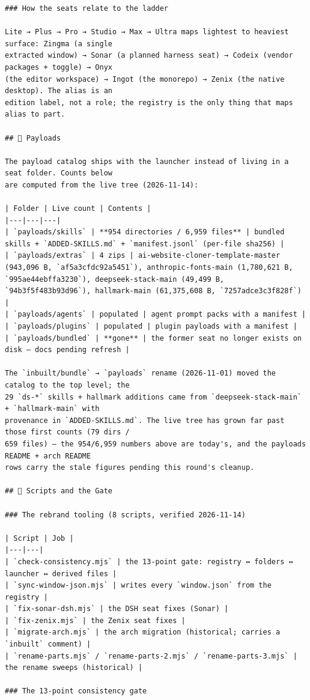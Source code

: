 \begin{Verbatim}[breaklines,breakanywhere,fontsize=\footnotesize]
### How the seats relate to the ladder

Lite → Plus → Pro → Studio → Max → Ultra maps lightest to heaviest surface: Zingma (a single
extracted window) → Sonar (a planned harness seat) → Codeix (vendor packages + toggle) → Onyx
(the editor workspace) → Ingot (the monorepo) → Zenix (the native desktop). The alias is an
edition label, not a role; the registry is the only thing that maps alias to part.

## 🎒 Payloads

The payload catalog ships with the launcher instead of living in a seat folder. Counts below
are computed from the live tree (2026-11-14):

| Folder | Live count | Contents |
|---|---|---|
| `payloads/skills` | **954 directories / 6,959 files** | bundled skills + `ADDED-SKILLS.md` + `manifest.jsonl` (per-file sha256) |
| `payloads/extras` | 4 zips | ai-website-cloner-template-master (943,096 B, `af5a3cfdc92a5451`), anthropic-fonts-main (1,780,621 B, `995ae44ebffa3230`), deepseek-stack-main (49,499 B, `94b3f5f483b93d96`), hallmark-main (61,375,608 B, `7257adce3c3f828f`) |
| `payloads/agents` | populated | agent prompt packs with a manifest |
| `payloads/plugins` | populated | plugin payloads with a manifest |
| `payloads/bundled` | **gone** | the former seat no longer exists on disk — docs pending refresh |

The `inbuilt/bundle` → `payloads` rename (2026-11-01) moved the catalog to the top level; the
29 `ds-*` skills + hallmark additions came from `deepseek-stack-main` + `hallmark-main` with
provenance in `ADDED-SKILLS.md`. The live tree has grown far past those first counts (79 dirs /
659 files) — the 954/6,959 numbers above are today's, and the payloads README + arch README
rows carry the stale figures pending this round's cleanup.

## 🧰 Scripts and the Gate

### The rebrand tooling (8 scripts, verified 2026-11-14)

| Script | Job |
|---|---|
| `check-consistency.mjs` | the 13-point gate: registry ↔ folders ↔ launcher ↔ derived files |
| `sync-window-json.mjs` | writes every `window.json` from the registry |
| `fix-sonar-dsh.mjs` | the DSH seat fixes (Sonar) |
| `fix-zenix.mjs` | the Zenix seat fixes |
| `migrate-arch.mjs` | the arch migration (historical; carries a `inbuilt` comment) |
| `rename-parts.mjs` / `rename-parts-2.mjs` / `rename-parts-3.mjs` | the rename sweeps (historical) |

### The 13-point consistency gate


\end{Verbatim}
